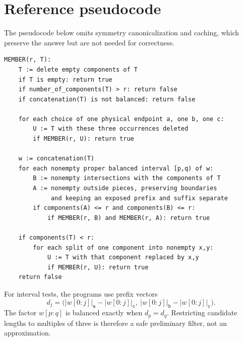 \documentclass[11pt,letterpaper]{article}
\numberwithin{equation}{section}
\theoremstyle{definition}
\theoremstyle{remark}
\newcommand{\len}[1]{\lvert #1\rvert}
\renewcommand{\aa}{\mathtt a}
\newcommand{\bb}{\mathtt b}
\newcommand{\cc}{\mathtt c}
\begin{document}
\section{Reference pseudocode}
\label{app:pseudocode}
The pseudocode below omits symmetry canonicalization and caching,
which preserve the answer but are not needed for correctness.
\begin{lstlisting}
MEMBER(r, T):
    T := delete empty components of T
    if T is empty: return true
    if number_of_components(T) > r: return false
    if concatenation(T) is not balanced: return false

    for each choice of one physical endpoint a, one b, one c:
        U := T with these three occurrences deleted
        if MEMBER(r, U): return true

    w := concatenation(T)
    for each nonempty proper balanced interval [p,q) of w:
        B := nonempty intersections with the components of T
        A := nonempty outside pieces, preserving boundaries
             and keeping an exposed prefix and suffix separate
        if components(A) <= r and components(B) <= r:
            if MEMBER(r, B) and MEMBER(r, A): return true

    if components(T) < r:
        for each split of one component into nonempty x,y:
            U := T with that component replaced by x,y
            if MEMBER(r, U): return true
    return false
\end{lstlisting}

For interval tests, the programs use prefix vectors
\[
 d_j=\bigl(\len{w[0:j]}_{\aa}-\len{w[0:j]}_{\cc},\
           \len{w[0:j]}_{\bb}-\len{w[0:j]}_{\cc}\bigr).
\]
The factor \(w[p:q]\) is balanced exactly when \(d_p=d_q\).
Restricting candidate lengths to multiples of three is therefore a
safe preliminary filter, not an approximation.
\end{document}
